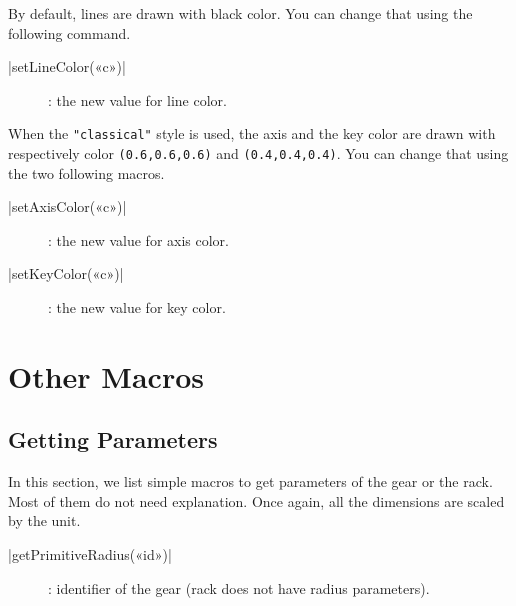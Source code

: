 \documentclass[english]{ltxdoc}
\begin{document}
By default, lines are drawn with black color. You can change that using the
following command.

\begin{colourband}
\commande|setLineColor(«c»)|\smallskip{}
\begin{description}
  \item[]:  the new value for line color. 
\end{description}
\end{colourband}

When the \lstinline+"classical"+ style is used, the axis and the key color are
drawn with respectively color \lstinline+(0.6,0.6,0.6)+ and 
\lstinline+(0.4,0.4,0.4)+. You can change that using the two following macros. 
\begin{colourband}
\commande|setAxisColor(«c»)|\smallskip{}
\begin{description}
  \item[]:  the new value for axis color. 
\end{description}
\end{colourband}


\begin{colourband}
\commande|setKeyColor(«c»)|\smallskip{}
\begin{description}
  \item[]:  the new value for key color. 
\end{description}
\end{colourband}

\section{Other Macros}

\subsection{Getting Parameters}

In this section, we list simple macros to get parameters of the gear or the
rack. Most of them do not need explanation. Once again, all the dimensions are
scaled by the \mpgears unit. 
\begin{colourband}
\commande|getPrimitiveRadius(«id»)|\smallskip{}
\begin{description}
  \item[]:  identifier of the gear (rack does not have
  radius parameters). 
\end{description}
\end{colourband}
\end{document}
